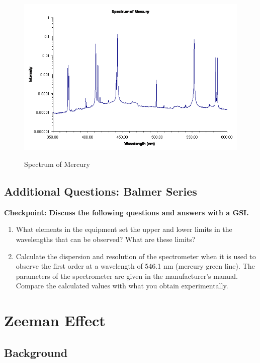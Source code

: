 \documentclass{../lab}
\begin{document}
\begin{figure}[h]
    \centering
    \href{http://experimentationlab.berkeley.edu/sites/default/files/images/Atmimage015.gif}{\includegraphics[width=0.8\linewidth]{images/Atmimage015.png}}
    \caption{Spectrum of Mercury}
    \label{fig:Atmimage015}
\end{figure}

\subsection{Additional Questions: Balmer Series}

\textbf{Checkpoint: Discuss the following questions and answers with a GSI.}


\begin{enumerate}

    \item What elements in the equipment set the upper and lower limits in the wavelengths that can be observed? What are these limits?

    \item Calculate the dispersion and resolution of the spectrometer when it is used to observe the first order at a wavelength of 546.1 nm (mercury green line). The parameters of the spectrometer are given in the manufacturer's manual. Compare the calculated values with what you obtain experimentally.

\end{enumerate}

\section{Zeeman Effect}

\subsection{Background}
\end{document}
